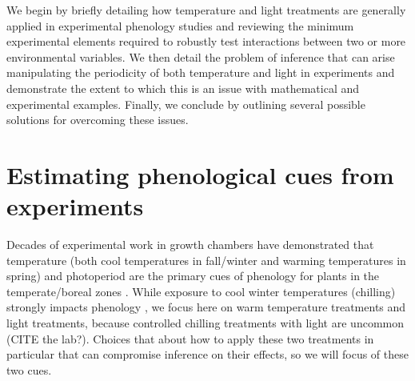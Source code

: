 \documentclass[11pt]{article}
\begin{document}
We begin by briefly detailing how temperature and light treatments are generally applied in experimental phenology studies and reviewing the minimum experimental elements required to robustly test interactions between two or more environmental variables. We then detail the problem of inference that can arise manipulating the periodicity of both temperature and light in experiments and demonstrate the extent to which this is an issue with mathematical and experimental examples. Finally, we conclude by outlining several possible solutions for overcoming these issues. 

\section*{Estimating phenological cues from experiments}
Decades of experimental work in growth chambers have demonstrated that temperature (both cool temperatures in fall/winter and warming temperatures in spring) and photoperiod are the primary cues of phenology for plants in the temperate/boreal zones \citep{Ettinger:2020aa}. While exposure to cool winter temperatures (chilling) strongly impacts phenology \citep{Laube2014}, we focus here on warm temperature treatments and light treatments, because controlled chilling treatments with light are uncommon (CITE the lab?). Choices that about how to apply these two treatments in particular that can compromise inference on their effects, so we will focus of these two cues.
\end{document}
